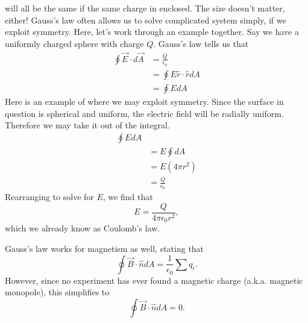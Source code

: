 \documentclass[nobib]{tufte-handout}
\begin{document}
will all be the same if the same charge in enclosed. 
The size doesn't matter, either! Gauss's law often
allows us to solve complicated system simply, if we 
exploit symmetry. Here, let's work through an example together. 
Say we have a uniformly charged sphere with charge $Q$. Gauss's law 
tells us that 
\begin{align*}
    \oint \vec{E} \cdot d\vec{A} &= \frac{Q}{\epsilon_0} \\
    &= \oint E \hat{r}\cdot \hat{r} dA \\
    &= \oint EdA
\end{align*}
Here is an example of where we may exploit symmetry. Since the 
surface in question is spherical and uniform, the electric field 
will be radially uniform. Therefore we 
may take it out of the integral. 
\begin{align*}
    \oint EdA \\
    &= E \oint dA \\
    &= E(4 \pi r^2) \\
    &= \frac{Q}{\epsilon_0}
\end{align*}
Rearranging to solve for $E$, we find that 
\[E = \frac{Q}{4\pi \epsilon_0 r^2},\]
which we already know as Coulomb's law. 

Gauss's law works for magnetism as well, stating that 
\[\oint \vec{B} \cdot \hat{n} dA = \frac{1}{\epsilon_0} \sum q_i.\]
However, since no experiment has ever found 
a magnetic charge (a.k.a. magnetic monopole), 
this simplifies to 
\[\oint \vec{B} \cdot \hat{n} dA = 0.\]
\end{document}
